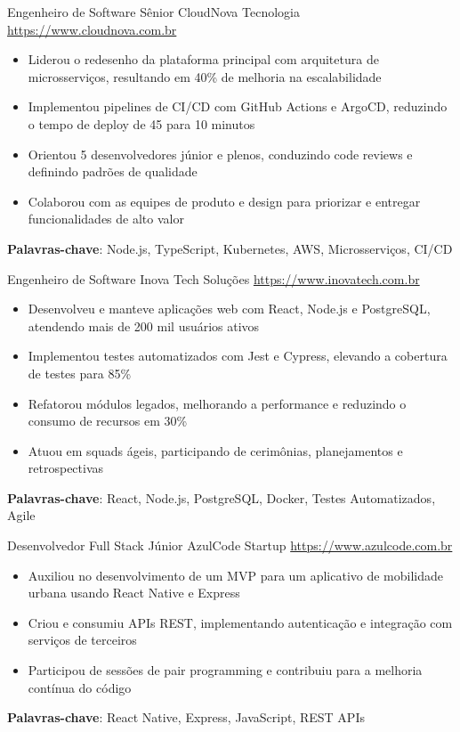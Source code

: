 \documentclass[a4paper, serif, 10pt]{moderncv}
\begin{document}
        {Engenheiro de Software Sênior}
        {CloudNova Tecnologia}
        {\url{https://www.cloudnova.com.br}}
        {}
        {\begin{itemize}
\item Liderou o redesenho da plataforma principal com arquitetura de microsserviços, resultando em 40\% de melhoria na escalabilidade
\item Implementou pipelines de CI/CD com GitHub Actions e ArgoCD, reduzindo o tempo de deploy de 45 para 10 minutos
\item Orientou 5 desenvolvedores júnior e plenos, conduzindo code reviews e definindo padrões de qualidade
\item Colaborou com as equipes de produto e design para priorizar e entregar funcionalidades de alto valor
\end{itemize}
\textbf{Palavras-chave}: Node.js, TypeScript, Kubernetes, AWS, Microsserviços, CI/CD}

        {Engenheiro de Software}
        {Inova Tech Soluções}
        {\url{https://www.inovatech.com.br}}
        {}
        {\begin{itemize}
\item Desenvolveu e manteve aplicações web com React, Node.js e PostgreSQL, atendendo mais de 200 mil usuários ativos
\item Implementou testes automatizados com Jest e Cypress, elevando a cobertura de testes para 85\%
\item Refatorou módulos legados, melhorando a performance e reduzindo o consumo de recursos em 30\%
\item Atuou em squads ágeis, participando de cerimônias, planejamentos e retrospectivas
\end{itemize}
\textbf{Palavras-chave}: React, Node.js, PostgreSQL, Docker, Testes Automatizados, Agile}

        {Desenvolvedor Full Stack Júnior}
        {AzulCode Startup}
        {\url{https://www.azulcode.com.br}}
        {}
        {\begin{itemize}
\item Auxiliou no desenvolvimento de um MVP para um aplicativo de mobilidade urbana usando React Native e Express
\item Criou e consumiu APIs REST, implementando autenticação e integração com serviços de terceiros
\item Participou de sessões de pair programming e contribuiu para a melhoria contínua do código
\end{itemize}
\textbf{Palavras-chave}: React Native, Express, JavaScript, REST APIs}
\end{document}
